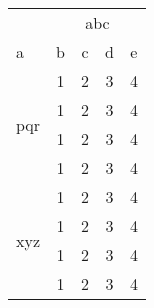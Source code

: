 \documentclass[a4paper,11pt]{article}
\begin{document}
 
\begin{table}[htbp]
\begin{center}
\begin{tabular}{l|c|c|c|c}
\hline
&&\multicolumn{2}{c|}{abc}\\
\cline{3-4}
a&b&c&d&e\\
\hline
\multirow{4}{*}{pqr}&1&2&3&4\\
&1&2&3&4\\
&1&2&3&4\\
&1&2&3&4\\
\hline
\multirow{4}{*}{xyz}&1&2&3&4\\
&1&2&3&4\\
&1&2&3&4\\
&1&2&3&4\\
\hline
\end{tabular}
\end{center}
\end{table}
 
\end{document}
